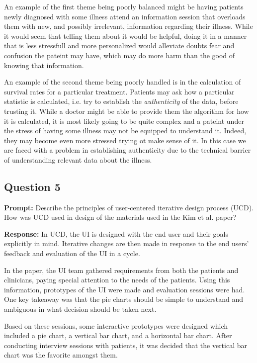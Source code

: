\documentclass{article}
\begin{document}
An example of the first theme being poorly balanced might be having patients newly diagnosed with some illness attend an information session that overloads them with new, and possibly irrelevant, information regarding their illness. While it would seem that telling them about it would be helpful, doing it in a manner that is less stressfull and more personalized would alleviate doubts fear and confusion the pateint may have, which may do more harm than the good of knowing that information.

An example of the second theme being poorly handled is in the calculation of survival rates for a particular treatment. Patients may ask how a particular statistic is calculated, i.e. try to establish the \textit{authenticity} of the data, before trusting it. While a doctor might be able to provide them the algorithm for how it is calculated, it is most likely going to be quite complex and a pateint under the stress of having some illness may not be equipped to understand it. Indeed, they may become even more stressed trying ot make sense of it. In this case we are faced with a problem in establishing authenticity due to the technical barrier of understanding relevant data about the illness.

\subsection*{Question 5}
\noindent\textbf{Prompt:} Describe the principles of user-centered iterative design process (UCD). How was UCD used in design of the materials used in the Kim et al. paper?
\bigskip

\noindent\textbf{Response:} In UCD, the UI is designed with the end user and their goals explicitly in mind. Iterative changes are then made in response to the end users' feedback and evaluation of the UI in a cycle.

In the paper, the UI team gathered requirements from both the patients and clinicians, paying special attention to the needs of the patients. Using this information, prototypes of the UI were made and evaluation sessions were had. One key takeaway was that the pie charts should be simple to understand and ambiguous in what decision should be taken next. 

Based on these sessions, some interactive prototypes were designed which included a pie chart, a vertical bar chart, and a horizontal bar chart. After conducting interview sessions with patients, it was decided that the vertical bar chart was the favorite amongst them.
\end{document}

